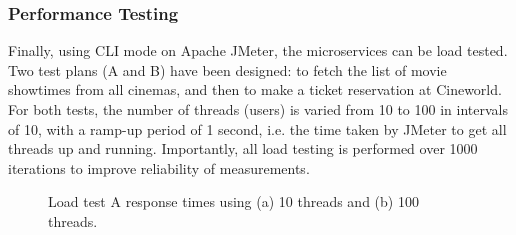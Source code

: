 \subsubsection{Performance Testing}

Finally, using CLI mode on Apache JMeter, the microservices can be load tested. Two test plans (A and B) have been designed: to fetch the list of movie showtimes from all cinemas, and then to make a ticket reservation at Cineworld. For both tests, the number of threads (users) is varied from 10 to 100 in intervals of 10, with a ramp-up period of 1 second, i.e. the time taken by JMeter to get all threads up and running. Importantly, all load testing is performed over 1000 iterations to improve reliability of measurements.

\begin{figure}[H]
  \centering
  \caption{Load test A response times using (a) 10 threads and (b) 100 threads.}
  \label{fig:cs01-lta-12}
\end{figure}

